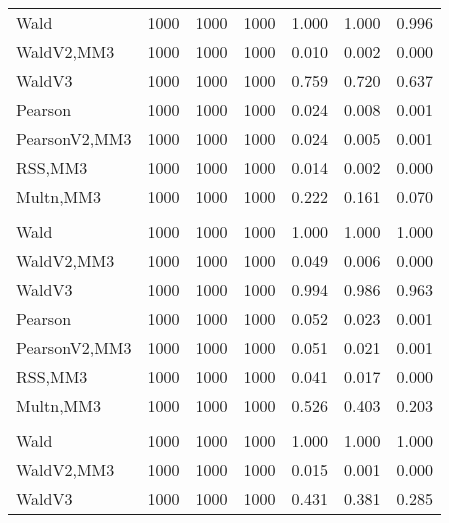 \documentclass[
]{article}
\begin{document}
\begin{table}[H]
{\begin{tabular}[t]{lrrrrrr}
\hspace{1em}Wald & 1000 & 1000 & 1000 & 1.000 & 1.000 & 0.996\\
\hspace{1em}WaldV2,MM3 & 1000 & 1000 & 1000 & 0.010 & 0.002 & 0.000\\
\hspace{1em}WaldV3 & 1000 & 1000 & 1000 & 0.759 & 0.720 & 0.637\\
\hspace{1em}Pearson & 1000 & 1000 & 1000 & 0.024 & 0.008 & 0.001\\
\hspace{1em}PearsonV2,MM3 & 1000 & 1000 & 1000 & 0.024 & 0.005 & 0.001\\
\hspace{1em}RSS,MM3 & 1000 & 1000 & 1000 & 0.014 & 0.002 & 0.000\\
\hspace{1em}Multn,MM3 & 1000 & 1000 & 1000 & 0.222 & 0.161 & 0.070\\
\addlinespace[0.3em]
\multicolumn{7}{l}{\textbf{2F 10V}}\\
\hspace{1em}Wald & 1000 & 1000 & 1000 & 1.000 & 1.000 & \vphantom{1} 1.000\\
\hspace{1em}WaldV2,MM3 & 1000 & 1000 & 1000 & 0.049 & 0.006 & 0.000\\
\hspace{1em}WaldV3 & 1000 & 1000 & 1000 & 0.994 & 0.986 & 0.963\\
\hspace{1em}Pearson & 1000 & 1000 & 1000 & 0.052 & 0.023 & 0.001\\
\hspace{1em}PearsonV2,MM3 & 1000 & 1000 & 1000 & 0.051 & 0.021 & 0.001\\
\hspace{1em}RSS,MM3 & 1000 & 1000 & 1000 & 0.041 & 0.017 & 0.000\\
\hspace{1em}Multn,MM3 & 1000 & 1000 & 1000 & 0.526 & 0.403 & 0.203\\
\addlinespace[0.3em]
\multicolumn{7}{l}{\textbf{3F 15V}}\\
\hspace{1em}Wald & 1000 & 1000 & 1000 & 1.000 & 1.000 & 1.000\\
\hspace{1em}WaldV2,MM3 & 1000 & 1000 & 1000 & 0.015 & 0.001 & 0.000\\
\hspace{1em}WaldV3 & 1000 & 1000 & 1000 & 0.431 & 0.381 & 0.285\\

\end{tabular}}
\end{table}
\end{document}
